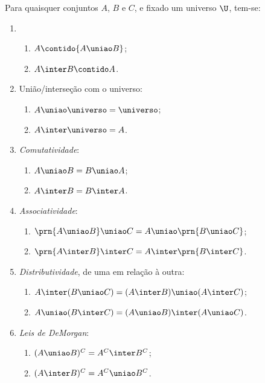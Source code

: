 \begin{proposition}
    \label{prop:uniao-e-intersecao}
    Para quaisquer conjuntos $A$, $B$ e $C$, e fixado um universo $\U$, tem-se:
    \begin{enumerate}
        \item
            \begin{enumerate}
                \label{prop:uniao-e-intersecao-inclusao}
                \item
                    $A \contido {A \uniao B}$;
                \item
                    ${A \inter B} \contido A$.
            \end{enumerate}

        \item
            União/interseção com o universo:
            \begin{enumerate}
                \item $A \uniao \universo = \universo$;
                \item $A \inter \universo = A$.
            \end{enumerate}

        \item
            \emph{Comutatividade}:
            \begin{enumerate}
                \item $A \uniao B = B \uniao A$;
                \item $A \inter B = B \inter A$.
            \end{enumerate}

        \item
            \emph{Associatividade}:
            \begin{enumerate}
                \item $\prn{A \uniao B} \uniao C = A \uniao \prn{ B \uniao C}$;
                \item $\prn{A \inter B} \inter C = A \inter \prn{ B \inter C}$.
            \end{enumerate}

        \item
            \emph{Distributividade}, de uma em relação à outra:
            \begin{enumerate}
                \item $A \inter (B \uniao C) = (A \inter B) \uniao (A \inter C)$;
                \item $A \uniao (B \inter C) = (A \uniao B) \inter (A \uniao C)$.
            \end{enumerate}

        \item
            \label{prop:demorgan}
            \emph{Leis de DeMorgan}:
            \begin{enumerate}
                \item $(A \uniao B)^C = A^C \inter B^C$;
                \item $(A \inter B)^C = A^C \uniao B^C$.
            \end{enumerate}
    \end{enumerate}
\end{proposition}

